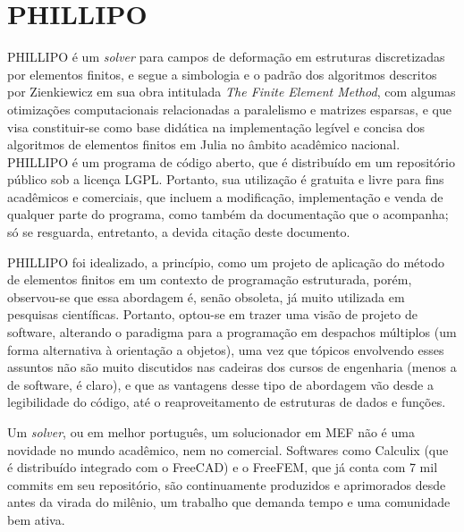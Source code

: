 

\chapter{PHILLIPO}

PHILLIPO é um \emph{solver} para campos de deformação em estruturas discretizadas por elementos finitos, e segue a simbologia e o padrão dos algoritmos descritos por Zienkiewicz em sua obra intitulada \emph{The Finite Element Method}, com algumas otimizações computacionais relacionadas a paralelismo e matrizes esparsas, e que visa constituir-se como base didática na implementação legível e concisa dos algoritmos de elementos finitos em Julia no âmbito acadêmico nacional. PHILLIPO é um programa de código aberto, que é distribuído em um repositório público\footnotemark[1]{} sob a licença LGPL\footnotemark[2]{}. Portanto, sua utilização é gratuita e livre para fins acadêmicos e comerciais, que incluem a modificação, implementação e venda de qualquer parte do programa, como também da documentação que o acompanha; só se resguarda, entretanto, a devida citação deste documento.

PHILLIPO foi idealizado, a princípio, como um projeto de aplicação do método de elementos finitos em um contexto de programação estruturada, porém, observou-se que essa abordagem é, senão obsoleta, já muito utilizada em pesquisas científicas. Portanto, optou-se em trazer uma visão de projeto de software, alterando o paradigma para a programação em despachos múltiplos (um forma alternativa à orientação a objetos), uma vez que tópicos envolvendo esses assuntos não são muito discutidos nas cadeiras dos cursos de engenharia (menos a de software, é claro), e que as vantagens desse tipo de abordagem vão desde a legibilidade do código, até o reaproveitamento de estruturas de dados e funções.

Um \emph{solver}, ou em melhor português, um solucionador em MEF não é uma novidade no mundo acadêmico, nem no comercial. Softwares como Calculix (que é distribuído integrado com o FreeCAD) e o FreeFEM, que já conta com 7 mil commits em seu repositório, são continuamente produzidos e aprimorados desde antes da virada do milênio, um trabalho que demanda tempo e uma comunidade bem ativa.

